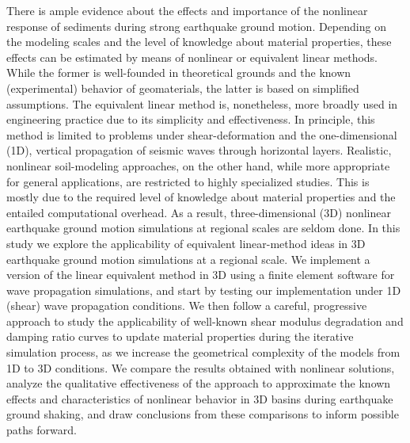 %
There is ample evidence about the effects and importance of the nonlinear response of sediments during strong earthquake ground motion. Depending on the modeling scales and the level of knowledge about material properties, these effects can be estimated by means of nonlinear or equivalent linear methods. While the former is well-founded in theoretical grounds and the known (experimental) behavior of geomaterials, the latter is based on simplified assumptions. The equivalent linear method is, nonetheless, more broadly used in engineering practice due to its simplicity and effectiveness. In principle, this method is limited to problems under shear-deformation and the one-dimensional (1D), vertical propagation of seismic waves through horizontal layers. Realistic, nonlinear soil-modeling approaches, on the other hand, while more appropriate for general applications, are restricted to highly specialized studies. This is mostly due to the required level of knowledge about material properties and the entailed computational overhead. As a result, three-dimensional (3D) nonlinear earthquake ground motion simulations at regional scales are seldom done. In this study we explore the applicability of equivalent linear-method ideas in 3D earthquake ground motion simulations at a regional scale. We implement a version of the linear equivalent method in 3D using a finite element software for wave propagation simulations, and start by testing our implementation under 1D (shear) wave propagation conditions. We then follow a careful, progressive approach to study the applicability of well-known shear modulus degradation and damping ratio curves to update material properties during the iterative simulation process, as we increase the geometrical complexity of the models from 1D to 3D conditions. We compare the results obtained with nonlinear solutions, analyze the qualitative effectiveness of the approach to approximate the known effects and characteristics of nonlinear behavior in 3D basins during earthquake ground shaking, and draw conclusions from these comparisons to inform possible paths forward.